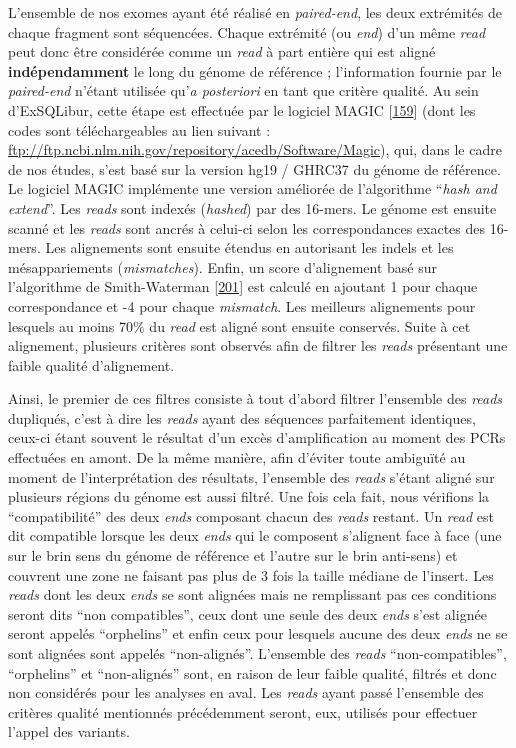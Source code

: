 \documentclass[12pt,a4paper,twoside]{ugathesis}
\theoremstyle{definition}
\theoremstyle{definition}
\theoremstyle{definition}
\theoremstyle{remark}
\begin{document}
L'ensemble de nos exomes ayant été réalisé en \emph{paired-end}, les
deux extrémités de chaque fragment sont séquencées. Chaque extrémité (ou
\emph{end}) d'un même \emph{read} peut donc être considérée comme un
\emph{read} à part entière qui est aligné \textbf{indépendamment} le
long du génome de référence ; l'information fournie par le
\emph{paired-end} n'étant utilisée qu'\emph{a posteriori} en tant que
critère qualité. Au sein d'ExSQLibur, cette étape est effectuée par le
logiciel MAGIC {[}\protect\hyperlink{ref-Su2014}{159}{]} (dont les codes
sont téléchargeables au lien suivant :
\url{ftp://ftp.ncbi.nlm.nih.gov/repository/acedb/Software/Magic}), qui,
dans le cadre de nos études, s'est basé sur la version hg19 / GHRC37 du
génome de référence. Le logiciel MAGIC implémente une version améliorée
de l'algorithme ``\emph{hash and extend}''. Les \emph{reads} sont
indexés (\emph{hashed}) par des 16-mers. Le génome est ensuite scanné et
les \emph{reads} sont ancrés à celui-ci selon les correspondances
exactes des 16-mers. Les alignements sont ensuite étendus en autorisant
les indels et les mésappariements (\emph{mismatches}). Enfin, un score
d'alignement basé sur l'algorithme de Smith-Waterman
{[}\protect\hyperlink{ref-Smith1981}{201}{]} est calculé en ajoutant 1
pour chaque correspondance et -4 pour chaque \emph{mismatch}. Les
meilleurs alignements pour lesquels au moins 70\% du \emph{read} est
aligné sont ensuite conservés. Suite à cet alignement, plusieurs
critères sont observés afin de filtrer les \emph{reads} présentant une
faible qualité d'alignement.

Ainsi, le premier de ces filtres consiste à tout d'abord filtrer
l'ensemble des \emph{reads} dupliqués, c'est à dire les \emph{reads}
ayant des séquences parfaitement identiques, ceux-ci étant souvent le
résultat d'un excès d'amplification au moment des PCRs effectuées en
amont. De la même manière, afin d'éviter toute ambiguïté au moment de
l'interprétation des résultats, l'ensemble des \emph{reads} s'étant
aligné sur plusieurs régions du génome est aussi filtré. Une fois cela
fait, nous vérifions la ``compatibilité'' des deux \emph{ends} composant
chacun des \emph{reads} restant. Un \emph{read} est dit compatible
lorsque les deux \emph{ends} qui le composent s'alignent face à face
(une sur le brin sens du génome de référence et l'autre sur le brin
anti-sens) et couvrent une zone ne faisant pas plus de 3 fois la taille
médiane de l'insert. Les \emph{reads} dont les deux \emph{ends} se sont
alignées mais ne remplissant pas ces conditions seront dits ``non
compatibles'', ceux dont une seule des deux \emph{ends} s'est alignée
seront appelés ``orphelins'' et enfin ceux pour lesquels aucune des deux
\emph{ends} ne se sont alignées sont appelés ``non-alignés''. L'ensemble
des \emph{reads} ``non-compatibles'', ``orphelins'' et ``non-alignés''
sont, en raison de leur faible qualité, filtrés et donc non considérés
pour les analyses en aval. Les \emph{reads} ayant passé l'ensemble des
critères qualité mentionnés précédemment seront, eux, utilisés pour
effectuer l'appel des variants.
\end{document}
